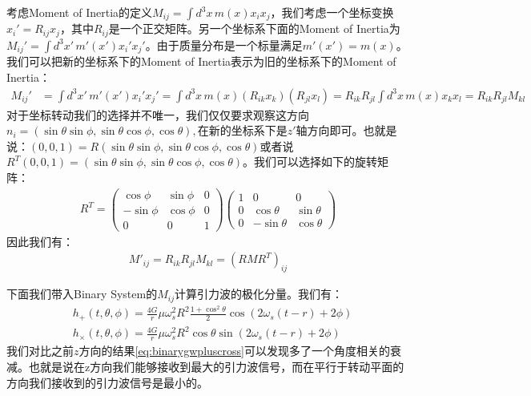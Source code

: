 \bigskip
{}

考虑Moment of Inertia的定义$  M_{ij} = \int d^3x\, m(x) x_i x_j
$，我们考虑一个坐标变换$ x_i' = R_{ij} x_j $，其中$ R_{ij} $是一个正交矩阵。另一个坐标系下面的Moment
of Inertia为$ M_{ij}' = \int d^3x'\, m'(x') x_i' x_j'
$。由于质量分布是一个标量满足$ m'(x') = m(x) $。我们可以把新的坐标系下的Moment of
Inertia表示为旧的坐标系下的Moment of Inertia：
\begin{align}
  M_{ij}' &= \int d^3x'\, m'(x') x_i' x_j' = \int d^3x\, m(x) (R_{ik}
  x_k)(R_{jl} x_l) = R_{ik} R_{jl} \int d^3x\, m(x) x_k x_l = R_{ik}
  R_{jl} M_{kl}
\end{align}
对于坐标转动我们的选择并不唯一，我们仅仅要求观察这方向 $
n_i=\left(\sin\theta\sin\phi,\sin\theta\cos\phi,\cos\theta\right),
$在新的坐标系下是$ z' $轴方向即可。也就是说：$ (0,0,1) = R (
\sin\theta\sin\phi,\sin\theta\cos\phi,\cos\theta) $或者说$ R^T (0,0,1) =
( \sin\theta\sin\phi,\sin\theta\cos\phi,\cos\theta)$。我们可以选择如下的旋转矩阵：
\begin{align}
  R^T=
  \begin{pmatrix}\cos\phi&\sin\phi&0\\-\sin\phi&\cos\phi&0\\0&0&1
  \end{pmatrix}
  \begin{pmatrix}1&0&0\\0&\cos\theta&\sin\theta\\0&-\sin\theta&\cos\theta
  \end{pmatrix}
\end{align}
因此我们有：
\begin{align}
  M'_{ij} = R_{ik} R_{jl} M_{kl} = (R M R^T)_{ij}
\end{align}

\bigskip
{}

下面我们带入Binary System的$ M_{ij} $计算引力波的极化分量。我们有：
\begin{align}
  &h_{+}(t,\theta,\phi)=\frac{4G}{r}\mu
  \omega_{s}^{2}R^{2}\frac{1+\cos^{2}\theta}{2}\cos(2\omega_{s}(t-r)+2\phi)\\
  &h_{\times}(t,\theta,\phi)=\frac{4G}{r}\mu
  \omega_{s}^{2}R^{2}\cos\theta\sin(2\omega_{s}(t-r)+2\phi)
\end{align}
我们对比之前$ z
$方向的结果\cref{eq:binarygwpluscross}可以发现多了一个角度相关的衰减。也就是说在z方向我们能够接收到最大的引力波信号，而在平行于转动平面的方向我们接收到的引力波信号是最小的。

